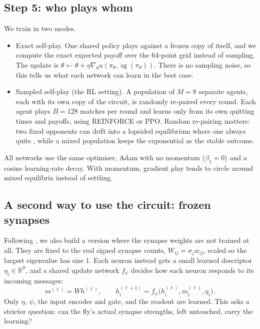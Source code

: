 \documentclass{article}
\newcommand{\R}{\mathbb{R}}
\newcommand{\sg}{\operatorname{sg}}
\begin{document}
\subsection{Step 5: who plays whom}

We train in two modes.
\begin{itemize}
  \item Exact self-play. One shared policy plays against a frozen copy of itself, and we compute the exact expected payoff over the 64-point grid instead of sampling. The update is $\theta \leftarrow \theta + \eta \nabla_\theta u(\pi_\theta, \sg(\pi_\theta))$. There is no sampling noise, so this tells us what each network can learn in the best case.
  \item Sampled self-play (the RL setting). A population of $M = 8$ separate agents, each with its own copy of the circuit, is randomly re-paired every round. Each agent plays $B = 128$ matches per round and learns only from its own quitting times and payoffs, using REINFORCE or PPO. Random re-pairing matters: two fixed opponents can drift into a lopsided equilibrium where one always quits \citep{selten1980}, while a mixed population keeps the exponential as the stable outcome.
\end{itemize}
All networks use the same optimiser, Adam \citep{kingma2015} with no momentum ($\beta_1 = 0$) and a cosine learning-rate decay. With momentum, gradient play tends to circle around mixed equilibria instead of settling.

\subsection{A second way to use the circuit: frozen synapses}

Following \citet{jin2026}, we also build a version where the synapse weights are not trained at all. They are fixed to the real signed synapse counts, $W_{ij} = \sigma_j w_{ij}$, scaled so the largest eigenvalue has size 1. Each neuron instead gets a small learned descriptor $\eta_i \in \R^9$, and a shared update network $f_\psi$ decides how each neuron responds to its incoming messages:
\[
m^{(\ell)} = W h^{(\ell)}, \qquad h_i^{(\ell+1)} = f_\psi\big(h_i^{(\ell)}, m_i^{(\ell)}, \eta_i\big).
\]
Only $\eta$, $\psi$, the input encoder and gate, and the readout are learned. This asks a stricter question: can the fly's actual synapse strengths, left untouched, carry the learning?
\end{document}
